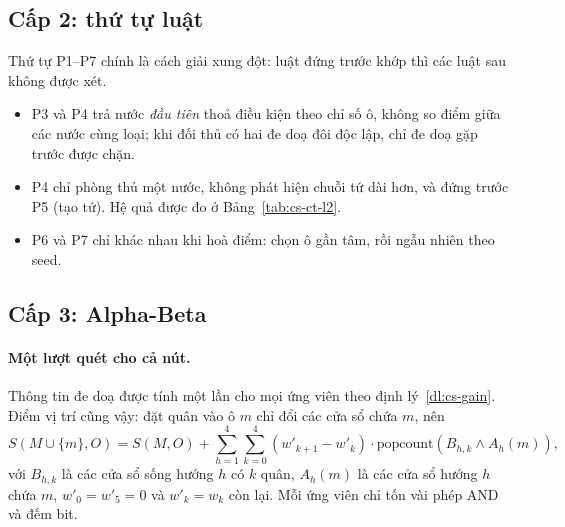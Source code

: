 \subsection{Cấp 2: thứ tự luật}
Thứ tự P1--P7 chính là cách giải xung đột: luật đứng trước khớp thì các luật sau không được xét.
\begin{itemize}
  \item P3 và P4 trả nước \emph{đầu tiên} thoả điều kiện theo chỉ số ô, không so điểm giữa các nước cùng loại; khi đối
  thủ có hai đe doạ đôi độc lập, chỉ đe doạ gặp trước được chặn.
  \item P4 chỉ phòng thủ một nước, không phát hiện chuỗi tứ dài hơn, và đứng trước P5 (tạo tứ). Hệ quả được đo ở
  Bảng~\ref{tab:cs-ct-l2}.
  \item P6 và P7 chỉ khác nhau khi hoà điểm: chọn ô gần tâm, rồi ngẫu nhiên theo seed.
\end{itemize}

\subsection{Cấp 3: Alpha-Beta}
\paragraph{Một lượt quét cho cả nút.} Thông tin đe doạ được tính một lần cho mọi ứng viên theo
định lý~\ref{dl:cs-gain}. Điểm vị trí cũng vậy: đặt quân vào ô $m$ chỉ đổi các cửa sổ chứa $m$, nên
\begin{equation}
  S(M\cup\{m\},O)=S(M,O)+\sum_{h=1}^{4}\sum_{k=0}^{4}(w'_{k+1}-w'_k)\cdot\mathrm{popcount}(B_{h,k}\wedge A_{h}(m)),
\end{equation}
với $B_{h,k}$ là các cửa sổ sống hướng $h$ có $k$ quân, $A_h(m)$ là các cửa sổ hướng $h$ chứa $m$, $w'_0=w'_5=0$ và
$w'_k=w_k$ còn lại. Mỗi ứng viên chỉ tốn vài phép AND và đếm bit.

